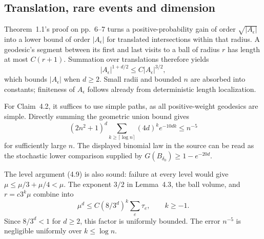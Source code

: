 \documentclass[10pt]{article}
\begin{document}
\subsection*{Translation, rare events and dimension}
Theorem 1.1’s proof on pp. 6–7 turns a positive-probability gain of order \(\sqrt{|A_\epsilon|}\) into a lower bound of order \(|A_\epsilon|\) for translated intersections within that radius. A geodesic’s segment between its first and last visits to a ball of radius \(r\) has length at most \(C(r+1)\). Summation over translations therefore yields \[|A_\epsilon|^{1+d/2}\leq C|A_\epsilon|^{3/2},\] which bounds \(|A_\epsilon|\) when \(d\geq2\). Small radii and bounded \(n\) are absorbed into constants; finiteness of \(A_\epsilon\) follows already from deterministic length localization.\par
For Claim 4.2, it suffices to use simple paths, as all positive-weight geodesics are simple. Directly summing the geometric union bound gives \[(2n^2+1)^d\sum_{k\geq\lceil\log n\rceil}
                 (4d)^k e^{-10dk}\leq n^{-5}\] for sufficiently large \(n\). The displayed binomial law in the source can be read as the stochastic lower comparison supplied by \(G(B_{\delta_0})\geq1-e^{-20d}\).\par
The level argument (4.9) is also sound: failure at every level would give \(\mu\leq\mu/3+\mu/4<\mu\). The exponent \(3/2\) in Lemma 4.3, the ball volume, and \(r=c3^k\mu\) combine into \[\mu^d\leq C(8/3^d)^k\sum_e\tau_e,\qquad k\geq-1 .\] Since \(8/3^d<1\) for \(d\geq2\), this factor is uniformly bounded. The error \(n^{-5}\) is negligible uniformly over \(k\leq\log n\).\par
\end{document}
